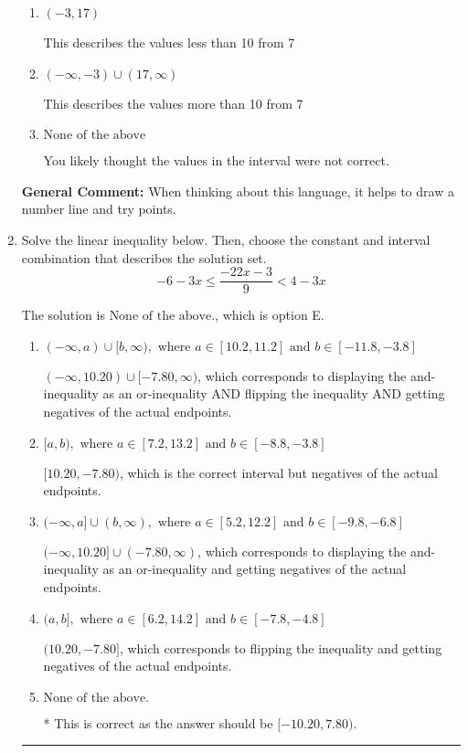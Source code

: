 \documentclass{extbook}[14pt]
\newcommand{\litem}[1]{\item #1

\rule{\textwidth}{0.4pt}}
\begin{document}
\begin{enumerate}
{\begin{enumerate}[label=\Alph*.]
This describes the values no more than 10 from 7
\item \( (-3, 17) \)

This describes the values less than 10 from 7
\item \( (-\infty, -3) \cup (17, \infty) \)

This describes the values more than 10 from 7
\item \( \text{None of the above} \)

You likely thought the values in the interval were not correct.
\end{enumerate}

\textbf{General Comment:} When thinking about this language, it helps to draw a number line and try points.
}
\litem{
Solve the linear inequality below. Then, choose the constant and interval combination that describes the solution set.
\[ -6 - 3 x \leq \frac{-22 x - 3}{9} < 4 - 3 x \]

The solution is \( \text{None of the above.} \), which is option E.\begin{enumerate}[label=\Alph*.]
\item \( (-\infty, a) \cup [b, \infty), \text{ where } a \in [10.2, 11.2] \text{ and } b \in [-11.8, -3.8] \)

$(-\infty, 10.20) \cup [-7.80, \infty)$, which corresponds to displaying the and-inequality as an or-inequality AND flipping the inequality AND getting negatives of the actual endpoints.
\item \( [a, b), \text{ where } a \in [7.2, 13.2] \text{ and } b \in [-8.8, -3.8] \)

$[10.20, -7.80)$, which is the correct interval but negatives of the actual endpoints.
\item \( (-\infty, a] \cup (b, \infty), \text{ where } a \in [5.2, 12.2] \text{ and } b \in [-9.8, -6.8] \)

$(-\infty, 10.20] \cup (-7.80, \infty)$, which corresponds to displaying the and-inequality as an or-inequality and getting negatives of the actual endpoints.
\item \( (a, b], \text{ where } a \in [6.2, 14.2] \text{ and } b \in [-7.8, -4.8] \)

$(10.20, -7.80]$, which corresponds to flipping the inequality and getting negatives of the actual endpoints.
\item \( \text{None of the above.} \)

* This is correct as the answer should be $[-10.20, 7.80)$.
\end{enumerate}

}
\end{enumerate}
\end{document}
